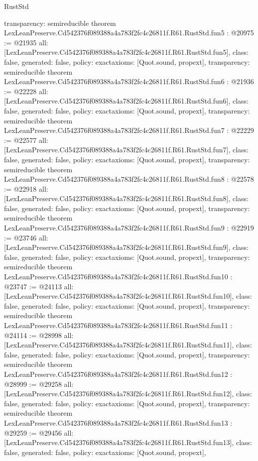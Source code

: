 \begin{lexlean}{RustStd}
\begin{coremodule}
{  transparency: semireducible
}
theorem LexLeanPreserve.Cd542376f089388a4a783f2fc4c26811f.R61.RustStd.fun5 : @20975 := @21935 {
  all: [LexLeanPreserve.Cd542376f089388a4a783f2fc4c26811f.R61.RustStd.fun5],
  class: false,
  generated: false,
  policy: exact{axioms: [Quot.sound, propext]},
  transparency: semireducible
}
theorem LexLeanPreserve.Cd542376f089388a4a783f2fc4c26811f.R61.RustStd.fun6 : @21936 := @22228 {
  all: [LexLeanPreserve.Cd542376f089388a4a783f2fc4c26811f.R61.RustStd.fun6],
  class: false,
  generated: false,
  policy: exact{axioms: [Quot.sound, propext]},
  transparency: semireducible
}
theorem LexLeanPreserve.Cd542376f089388a4a783f2fc4c26811f.R61.RustStd.fun7 : @22229 := @22577 {
  all: [LexLeanPreserve.Cd542376f089388a4a783f2fc4c26811f.R61.RustStd.fun7],
  class: false,
  generated: false,
  policy: exact{axioms: [Quot.sound, propext]},
  transparency: semireducible
}
theorem LexLeanPreserve.Cd542376f089388a4a783f2fc4c26811f.R61.RustStd.fun8 : @22578 := @22918 {
  all: [LexLeanPreserve.Cd542376f089388a4a783f2fc4c26811f.R61.RustStd.fun8],
  class: false,
  generated: false,
  policy: exact{axioms: [Quot.sound, propext]},
  transparency: semireducible
}
theorem LexLeanPreserve.Cd542376f089388a4a783f2fc4c26811f.R61.RustStd.fun9 : @22919 := @23746 {
  all: [LexLeanPreserve.Cd542376f089388a4a783f2fc4c26811f.R61.RustStd.fun9],
  class: false,
  generated: false,
  policy: exact{axioms: [Quot.sound, propext]},
  transparency: semireducible
}
theorem LexLeanPreserve.Cd542376f089388a4a783f2fc4c26811f.R61.RustStd.fun10 : @23747 := @24113 {
  all: [LexLeanPreserve.Cd542376f089388a4a783f2fc4c26811f.R61.RustStd.fun10],
  class: false,
  generated: false,
  policy: exact{axioms: [Quot.sound, propext]},
  transparency: semireducible
}
theorem LexLeanPreserve.Cd542376f089388a4a783f2fc4c26811f.R61.RustStd.fun11 : @24114 := @28998 {
  all: [LexLeanPreserve.Cd542376f089388a4a783f2fc4c26811f.R61.RustStd.fun11],
  class: false,
  generated: false,
  policy: exact{axioms: [Quot.sound, propext]},
  transparency: semireducible
}
theorem LexLeanPreserve.Cd542376f089388a4a783f2fc4c26811f.R61.RustStd.fun12 : @28999 := @29258 {
  all: [LexLeanPreserve.Cd542376f089388a4a783f2fc4c26811f.R61.RustStd.fun12],
  class: false,
  generated: false,
  policy: exact{axioms: [Quot.sound, propext]},
  transparency: semireducible
}
theorem LexLeanPreserve.Cd542376f089388a4a783f2fc4c26811f.R61.RustStd.fun13 : @29259 := @29456 {
  all: [LexLeanPreserve.Cd542376f089388a4a783f2fc4c26811f.R61.RustStd.fun13],
  class: false,
  generated: false,
  policy: exact{axioms: [Quot.sound, propext]},
}
\end{coremodule}
\end{lexlean}
